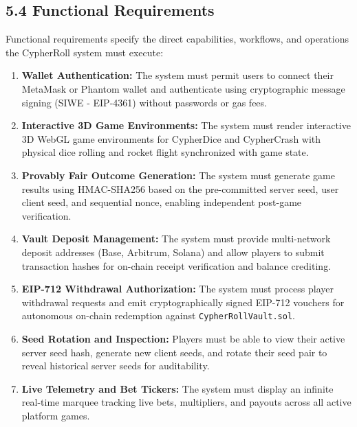 \subsection*{5.4 Functional Requirements}
Functional requirements specify the direct capabilities, workflows, and operations the CypherRoll system must execute:
\begin{enumerate}[leftmargin=1.5em]
    \item \textbf{Wallet Authentication:} The system must permit users to connect their MetaMask or Phantom wallet and authenticate using cryptographic message signing (SIWE - EIP-4361) without passwords or gas fees.
    \item \textbf{Interactive 3D Game Environments:} The system must render interactive 3D WebGL game environments for CypherDice and CypherCrash with physical dice rolling and rocket flight synchronized with game state.
    \item \textbf{Provably Fair Outcome Generation:} The system must generate game results using HMAC-SHA256 based on the pre-committed server seed, user client seed, and sequential nonce, enabling independent post-game verification.
    \item \textbf{Vault Deposit Management:} The system must provide multi-network deposit addresses (Base, Arbitrum, Solana) and allow players to submit transaction hashes for on-chain receipt verification and balance crediting.
    \item \textbf{EIP-712 Withdrawal Authorization:} The system must process player withdrawal requests and emit cryptographically signed EIP-712 vouchers for autonomous on-chain redemption against \texttt{CypherRollVault.sol}.
    \item \textbf{Seed Rotation and Inspection:} Players must be able to view their active server seed hash, generate new client seeds, and rotate their seed pair to reveal historical server seeds for auditability.
    \item \textbf{Live Telemetry and Bet Tickers:} The system must display an infinite real-time marquee tracking live bets, multipliers, and payouts across all active platform games.
\end{enumerate}

